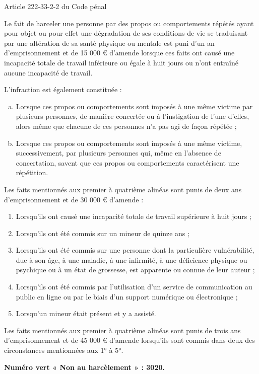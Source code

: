\documentclass[11pt]{article}
\begin{document}
\begin{center}
 \large Article 222-33-2-2 du Code pénal
\end{center}

\begin{framed}
Le fait de harceler une personne par des propos ou comportements répétés ayant pour objet ou pour effet une dégradation de ses conditions de vie se traduisant par une altération de sa santé physique ou mentale est puni d'un an d'emprisonnement et de 15 000 € d'amende lorsque ces faits ont causé une incapacité totale de travail inférieure ou égale à huit jours ou n'ont entraîné aucune incapacité de travail.

L'infraction est également constituée :

\begin{enumerate}[a)]
  \item  Lorsque ces propos ou comportements sont imposés à une même victime par plusieurs personnes, de manière concertée ou à l'instigation de l'une d'elles, alors même que chacune de ces personnes n'a pas agi de façon répétée ;
  \item Lorsque ces propos ou comportements sont imposés à une même victime, successivement, par plusieurs personnes qui, même en l'absence de concertation, savent que ces propos ou comportements caractérisent une répétition.
\end{enumerate}

Les faits mentionnés aux premier à quatrième alinéas sont punis de deux ans d'emprisonnement et de 30 000 € d'amende :

\begin{enumerate}[1\degre]
  \item Lorsqu'ils ont causé une incapacité totale de travail supérieure à huit jours ;
  \item Lorsqu'ils ont été commis sur un mineur de quinze ans ;
  \item Lorsqu'ils ont été commis sur une personne dont la particulière vulnérabilité, due à son âge, à une maladie, à une infirmité, à une déficience physique ou psychique ou à un état de grossesse, est apparente ou connue de leur auteur ;
  \item Lorsqu'ils ont été commis par l'utilisation d'un service de communication au public en ligne ou par le biais d'un support numérique ou électronique ;
  \item Lorsqu'un mineur était présent et y a assisté.
\end{enumerate}

Les faits mentionnés aux premier à quatrième alinéas sont punis de trois ans d'emprisonnement et de 45 000 € d'amende lorsqu'ils sont commis dans deux des circonstances mentionnées aux 1° à 5°.
\end{framed}

\flushright \textbf{Numéro vert « Non au harcèlement » : 3020.}
\end{document}
